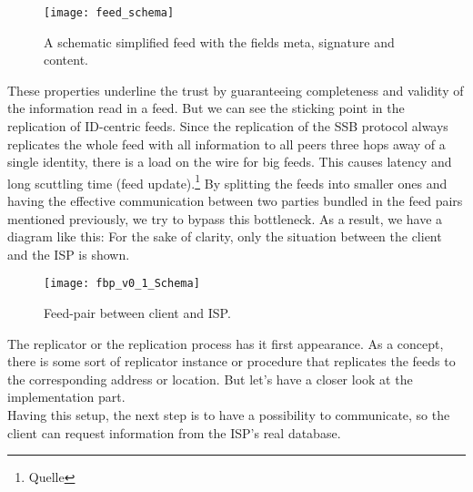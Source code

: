 \begin{figure}
    \centering
    \texttt{[image: feed\_schema]}
    \caption{A schematic simplified feed with the fields meta, signature and content.}
    \label{fig:feed_schema}
\end{figure}



These properties underline the trust by guaranteeing completeness and validity of the information read in a feed. But we can see the sticking point in the replication of ID-centric feeds. Since the replication of the SSB protocol always replicates the whole feed with all information to all peers three hops away of a single identity, there is a load on the wire for big feeds. This causes latency and long scuttling time (feed update).\footnote{Quelle} By splitting the feeds into smaller ones and having the effective communication between two parties bundled in the feed pairs mentioned previously, we try to bypass this bottleneck. As a result, we have a diagram like this: For the sake of clarity, only the situation between the client and the ISP is shown. 

\begin{figure}
    \centering
    \texttt{[image: fbp\_v0\_1\_Schema]}
    \caption{Feed-pair between client and ISP.}
    \label{fig:contract_cli_isp}
\end{figure}
The replicator or the replication process has it first appearance. As a concept, there is some sort of replicator instance or procedure that replicates the feeds to the corresponding address or location. But let’s have a closer look at the implementation part. \\
Having this setup, the next step is to have a possibility to communicate, so the client can request information from the ISP’s real database.

\pagebreak
